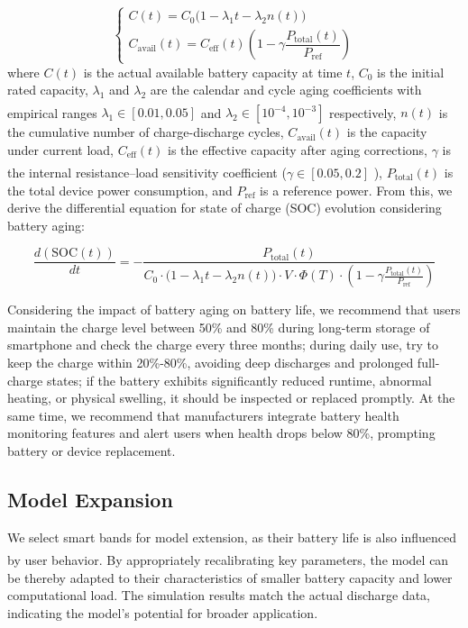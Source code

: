 \documentclass{mcmthesis}  %
\newcommand{\upcite}[1]{\textsuperscript{\textsuperscript{\cite{#1}}}}
\begin{document}
	\begin{equation}
		\begin{cases}
			C(t) = C_0\bigl(1 - \lambda_1 t - \lambda_2 n(t)\bigr) \\[8pt]
			C_{\text{avail}}(t) = C_{\text{eff}}(t) \left(1 - \gamma \dfrac{P_{\text{total}}(t)}{P_{\text{ref}}}\right)
		\end{cases}
	\end{equation}
	where $C(t)$ is the actual available battery capacity at time $t$, $C_0$ is the initial rated capacity, $\lambda_1$ and $\lambda_2$ are the calendar and cycle aging coefficients with empirical ranges $\lambda_1\in [0.01,0.05]$ \upcite{9} and $\lambda_2\in [10^{-4},10^{-3}]$ \upcite{10} respectively, $n(t)$ is the cumulative number of charge-discharge cycles, $C_{\text{avail}}(t)$ is the capacity under current load, $C_{\text{eff}}(t)$ is the effective capacity after aging corrections, $\gamma$ is the internal resistance–load sensitivity coefficient ($\gamma\in [0.05,0.2]$ \upcite{11}), $P_{\text{total}}(t)$ is the total device power consumption, and $P_{\text{ref}}$ is a reference power. From this, we derive the differential equation for state of charge (SOC) evolution considering battery aging:
	
	\begin{equation}
		\frac{d \left(\text{SOC}(t)\right)}{dt} = - \frac{P_{\text{total}}(t)}{C_0 \cdot \bigl(1 - \lambda_1 t - \lambda_2 n(t)\bigr) \cdot V \cdot \Phi(T) \cdot \left(1 - \gamma \frac{P_{\text{total}}(t)}{P_{\text{ref}}}\right)}
	\end{equation}
	
	Considering the impact of battery aging on battery life, we recommend that users maintain the charge level between 50\% and 80\% during long-term storage of smartphone and check the charge every three months; during daily use, try to keep the charge within 20\%-80\%, avoiding deep discharges and prolonged full-charge states; if the battery exhibits significantly reduced runtime, abnormal heating, or physical swelling, it should be inspected or replaced promptly. At the same time, we recommend that manufacturers integrate battery health monitoring features and alert users when health drops below 80\%, prompting battery or device replacement.
	
	\subsection{Model Expansion}
	
	We select smart bands for model extension, as their battery life is also influenced by user behavior\upcite{12}. By appropriately recalibrating key parameters, the model can be thereby adapted to their characteristics of smaller battery capacity and lower computational load. The simulation results match the actual discharge data, indicating the model's potential for broader application.
	
\end{document}
